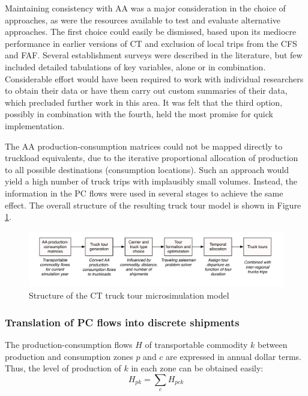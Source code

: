 Maintaining consistency with AA was a major consideration in the choice of approaches, as were the resources available to test and evaluate alternative approaches. The first choice could easily be dismissed, based upon its mediocre performance in earlier versions of CT and exclusion of local trips from the CFS and FAF. Several establishment surveys were described in the literature, but few included detailed tabulations of key variables, alone or in combination. Considerable effort would have been required to work with individual researchers to obtain their data or have them carry out custom summaries of their data, which precluded further work in this area. It was felt that the third option, possibly in combination with the fourth, held the most promise for quick implementation.

The AA production-consumption matrices could not be mapped directly to truckload equivalents, due to the iterative proportional allocation of production to all possible destinations (consumption locations). Such an approach would yield a high number of truck trips with implausibly small volumes. Instead, the information in the PC flows were used in several stages to achieve the same effect. The overall structure of the resulting truck tour model is shown in Figure \ref{fig:ct-tour-model}.

\begin{figure}
\centering
\includegraphics[width=6.25in, trim=0mm 8mm 0mm 0mm]{ct/ct-tour-model.pdf}
\caption{Structure of the CT truck tour microsimulation model}
\label{fig:ct-tour-model}
\end{figure}


\subsubsection{Translation of PC flows into discrete shipments}
The production-consumption flows $H$ of transportable commodity $k$ between production and consumption zones $p$ and $c$ are expressed in annual dollar terms. Thus, the level of production of $k$ in each zone can be obtained easily:
\begin{equation}\label{eq:ct-zonal-production}
H_{pk} = \sum_c H_{pck}
\end{equation}

